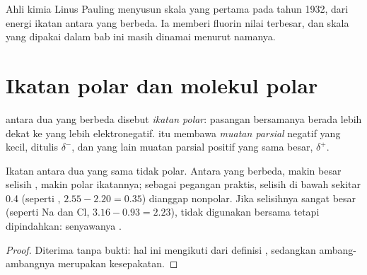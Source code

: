 \begin{history}
Ahli kimia Linus Pauling menyusun skala  yang pertama
pada tahun 1932, dari energi ikatan antara  yang berbeda. Ia
memberi fluorin nilai terbesar, dan skala yang dipakai dalam bab ini
masih dinamai menurut namanya.
\end{history}

\section{Ikatan polar dan molekul polar}

\begin{definition}\label{def:g11:polarity-and-cohesion:polar-bond}
 antara dua  yang  berbeda
disebut \emph{ikatan polar}: pasangan bersamanya
berada lebih dekat ke  yang lebih elektronegatif.  itu membawa
\emph{muatan parsial} negatif yang kecil, ditulis
$\delta^-$, dan  yang lain muatan parsial positif yang sama besar,
$\delta^+$.
\end{definition}

\begin{proposition}\label{prop:g11:polarity-and-cohesion:polar-bond}
Ikatan antara dua  yang sama tidak polar. Antara  yang
berbeda, makin besar selisih , makin polar
ikatannya; sebagai pegangan praktis, selisih di bawah sekitar 0.4
(seperti , $2.55 - 2.20 = 0.35$) dianggap nonpolar. Jika
selisihnya sangat besar (seperti Na dan Cl, $3.16 - 0.93 = 2.23$),
 tidak digunakan bersama tetapi dipindahkan:
senyawanya .
\end{proposition}

\begin{proof}
Diterima tanpa bukti: hal ini mengikuti dari definisi ,
sedangkan ambang-ambangnya merupakan kesepakatan.
\end{proof}


